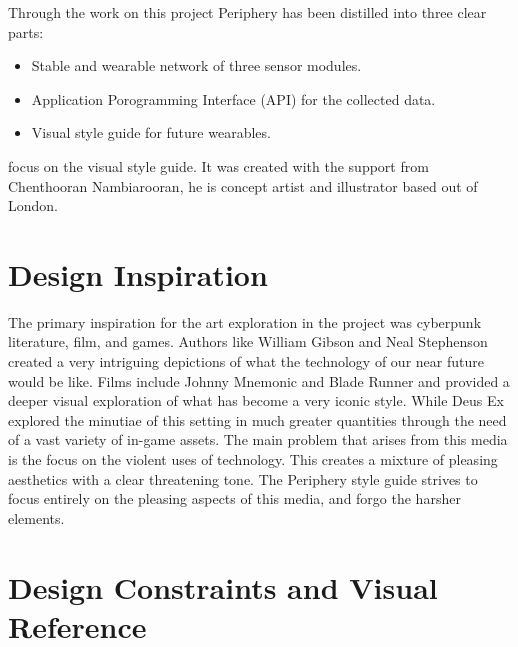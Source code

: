 
Through the work on this project Periphery has been distilled into three clear parts: 

\begin{itemize}
  \item Stable and wearable network of three sensor modules.
  \item Application Porogramming Interface (API) for the collected data.
  \item Visual style guide for future wearables.
\end{itemize}

 focus on the visual style guide. It was created with the support from Chenthooran Nambiarooran, he is concept artist and illustrator based out of London.

\section{Design Inspiration}

The primary inspiration for the art exploration in the project was cyberpunk literature, film, and games. Authors like William Gibson and Neal Stephenson created a very intriguing depictions of what the technology of our near future would be like. Films include Johnny Mnemonic and Blade Runner and provided a deeper visual exploration of what has become a very iconic style. While Deus Ex explored the minutiae of this setting in much greater quantities through the need of a vast variety of in-game assets. The main problem that arises from this media is the focus on the violent uses of technology. This creates a mixture of pleasing aesthetics with a clear threatening tone. The Periphery style guide strives to focus entirely on the pleasing aspects of this media, and forgo the harsher elements.
\FloatBarrier

\section{Design Constraints and Visual Reference}\label{sec:designconstraints}

